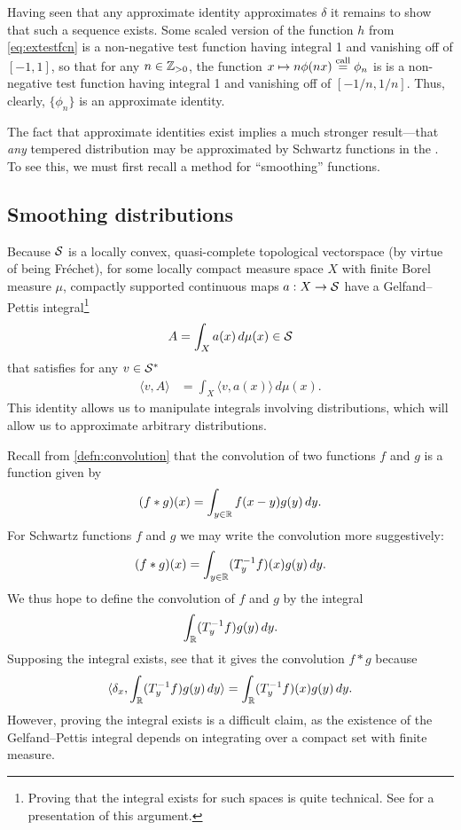     Having seen that any approximate identity approximates $\delta$ it remains to show that such a sequence exists.
    Some scaled version of the function $h$ from \cref{eq:extestfcn} is a non-negative test function having integral 1 and vanishing off of $[-1,1]$, so that for any $n\in\Z_{>0}$, the function $x\mapsto n\phi(nx) \call \phi_n$ is is a non-negative test function having integral 1 and vanishing off of $[-1/n,1/n]$.
    Thus, clearly, $\{\phi_n\}$ is an approximate identity.

    The fact that approximate identities exist implies a much stronger result---that \emph{any} tempered distribution may be approximated by Schwartz functions in the \ws.
    To see this, we must first recall a method for ``smoothing'' functions.

  \subsection{Smoothing distributions}
    Because $\S$ is a locally convex, quasi-complete topological vectorspace (by virtue of being Fr\'echet), for some locally compact measure space $X$ with finite Borel measure $\mu$, compactly supported continuous maps $a:X\rightarrow\S$ have a Gelfand--Pettis integral\footnote{Proving that the \gp integral exists for such spaces is quite technical. See \citet{vvint} for a presentation of this argument.}
    \begin{align*}
      A = \int_X a(x)\,d\mu(x) \in\S
    \end{align*}
    that satisfies for any $v\in\SS$
    \begin{align*}
      \langle v, A\rangle
      &= \int_X \langle v, a(x)\rangle\,d\mu(x) \text{.}
    \end{align*}
    This identity allows us to manipulate integrals involving distributions, which will allow us to approximate arbitrary distributions.

    Recall from \cref{defn:convolution} that the convolution of two functions $f$ and $g$ is a function given by
    \begin{align*}
      (f*g)(x) = \int_{y\in\R} f(x-y)g(y)\,dy \text{.}
    \end{align*}
    For Schwartz functions $f$ and $g$ we may write the convolution more suggestively:
    \begin{align*}
      (f*g)(x) = \int_{y\in\R} (T_y\inv f)(x)g(y)\,dy \text{.}
    \end{align*}
    We thus hope to define the convolution of $f$ and $g$ by the \gp integral
    \begin{align*}
      \int_\R (T_y\inv f)g(y)\,dy \text{.}
    \end{align*}
    Supposing the integral exists, see that it gives the convolution $f*g$ because
    \begin{align*}
      \langle\delta_x, \int_\R (T_y\inv f)g(y)\,dy\rangle 
      = \int_\R (T_y\inv f)(x)g(y)\,dy \text{.}
    \end{align*}
    However, proving the integral exists is a difficult claim, as the existence of the Gelfand--Pettis integral depends on integrating over a compact set with finite measure.

